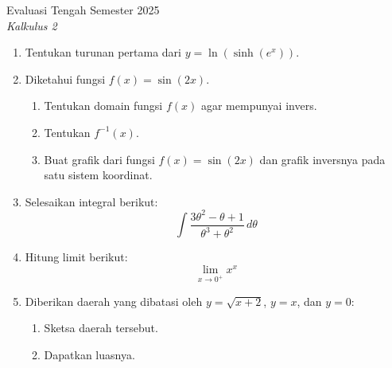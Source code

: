\documentclass[12pt]{article}
\begin{document}
\begin{center}
    {Evaluasi Tengah Semester 2025} \\
    \textit{Kalkulus 2} \\
\end{center}

\vspace{0.5cm}

\begin{enumerate}
    \item Tentukan turunan pertama dari $y = \ln(\sinh(e^x))$.

    \item Diketahui fungsi $f(x) = \sin(2x)$.
    \begin{enumerate}
        \item Tentukan domain fungsi $f(x)$ agar mempunyai invers.
        \item Tentukan $f^{-1}(x)$.
        \item Buat grafik dari fungsi $f(x) = \sin(2x)$ dan grafik inversnya pada satu sistem koordinat.
    \end{enumerate}

    \item Selesaikan integral berikut:
    \[
        \int \frac{3\theta^2 - \theta + 1}{\theta^3 + \theta^2} \, d\theta 
    \]

    \item Hitung limit berikut:
    \[
        \lim_{x \to 0^+} x^{x}
    \]

    \item Diberikan daerah yang dibatasi oleh $y = \sqrt{x+2}$, $y = x$, dan $y = 0$:
    \begin{enumerate}
        \item Sketsa daerah tersebut.
        \item Dapatkan luasnya.
    \end{enumerate}
\end{enumerate}
\end{document}
